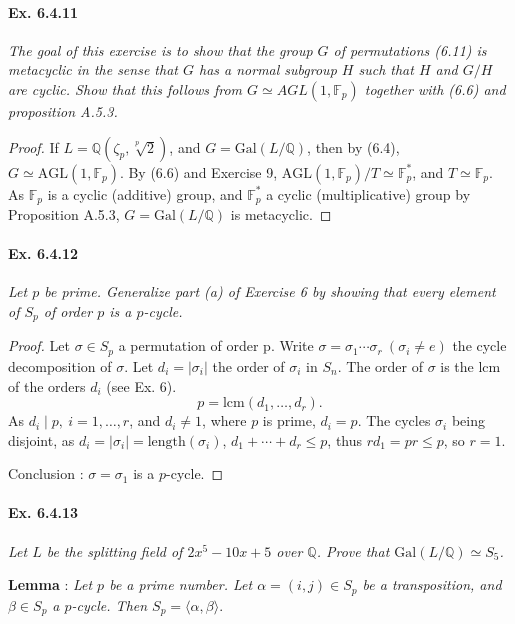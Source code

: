\documentclass[11pt,a4paper]{article}
\newcommand{\Q}{\mathbb{Q}}
\newcommand{\F}{\mathbb{F}}
\newcommand{\Gal}{\mathrm{Gal}}
\begin{document}
\paragraph{Ex. 6.4.11}

{\it The goal of this exercise is to show that the group $G$ of permutations (6.11) is metacyclic in the sense that $G$ has a normal subgroup $H$ such that $H$ and $G/H$ are cyclic. Show that this follows from $G \simeq AGL(1,\F_p)$ together with (6.6) and proposition A.5.3.
}

\begin{proof}
If $L=\Q(\zeta_p,\sqrt[p]{2})$, and $G = \Gal(L/\Q)$, then by (6.4), $G \simeq \mathrm{AGL}(1,\F_p)$.
By (6.6) and Exercise 9, $ \mathrm{AGL}(1,\F_p)/T \simeq \F_p^*$, and $T \simeq \F_p$. As $\F_p$ is a cyclic (additive) group, and $\F_p^*$ a cyclic (multiplicative) group by Proposition A.5.3, $G = \Gal(L/\Q)$ is metacyclic.
\end{proof}

\paragraph{Ex. 6.4.12}

{\it Let $p$ be prime. Generalize part (a) of Exercise 6 by showing that every element of $S_p$ of order $p$ is a $p$-cycle.
}

\begin{proof}
Let $\sigma \in S_p$ a permutation of order p. Write $\sigma = \sigma_1\cdots\sigma_r \ (\sigma_i\neq e)$ the cycle decomposition of $\sigma$. Let $d_i = |\sigma_i|$ the order of $\sigma_i$ in $S_n$.  The order of $\sigma$ is the lcm of the orders $d_i$ (see Ex. 6).
$$p = \mathrm{lcm}(d_1,\ldots,d_r).$$
As $d_i \mid p, \ i=1,\ldots,r$, and $d_i\neq 1$, where $p$ is prime, $d_i = p$. The cycles $\sigma_i$ being disjoint, as $d_i = |\sigma_i| =  \mathrm{length}(\sigma_i)$, $d_1+\cdots+d_r\leq p$, thus $rd_1 = pr\leq p$, so $r=1$.

Conclusion :  $\sigma = \sigma_1$ is a $p$-cycle.
\end{proof}

\paragraph{Ex. 6.4.13}

{\it Let $L$ be the splitting field of $2x^5 - 10x+ 5$ over $\Q$. Prove that ${\Gal(L/\Q) \simeq S_5}$.
}

{\bf Lemma} : {\it  Let $p$ be a prime number. Let $\alpha = (i,j)\in S_p$ be a transposition, and $\beta\in S_p$ a $p$-cycle. 
Then $S_p = \langle \alpha,\beta \rangle$}.
\end{document}
